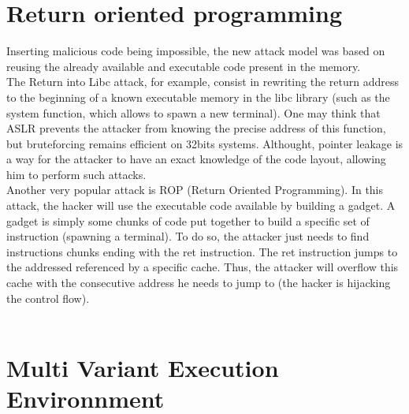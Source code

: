 \documentclass[english]{enstaPRE}
\begin{document}
\section{Return oriented programming}
Inserting malicious code being impossible, the new attack model was based on reusing the already available and executable code present
in the memory. \\ The Return into Libc attack, for example, consist in rewriting the return address to the beginning of a known
executable memory in the libc library (such as the system function, which allows to spawn a new terminal). One may think that ASLR
prevents the attacker from knowing the precise address of this function, but bruteforcing remains efficient on 32bits systems.
Althought, pointer leakage is a way for the attacker to have an exact knowledge of the code layout, allowing him to perform such attacks.
\\
Another very popular attack is ROP (Return Oriented Programming). In this attack, the hacker will use the executable code available 
by building a gadget. A gadget is simply some chunks of code put together to build a specific set of instruction (spawning a terminal).
To do so, the attacker just needs to find instructions chunks ending with the ret instruction. The ret instruction jumps to the addressed
referenced by a specific cache. Thus, the attacker will overflow this cache with the consecutive address he needs to jump to 
(the hacker is hijacking the control flow).
\\ \\

\section{Multi Variant Execution Environnment}
\end{document}
